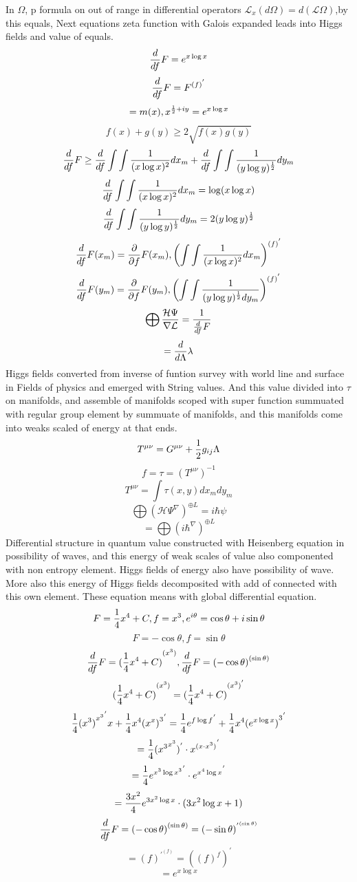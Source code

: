 \documentclass{jsarticle}
\begin{document}
       In $ \Omega $, p formula on out of range in differential operators
  $ \mathcal{L}_x (d \Omega) = d(\mathcal{L} \Omega) $,by this equals, 
  Next equations zeta function with Galois expanded
  leads into Higgs fields and value of equals.
  $$ {d \over df}F = e^{x \log x} $$
  $$ {d \over df}F = F^{{(f)}^{'}} $$
  $$ = m(x), x^{{1 \over 2} + iy} = e^{x \log x} $$
  $$ f(x) + g(y) \ge 2 \sqrt{f(x) g(y)} $$ 
  $$ {d \over df}F \ge {d \over df}\int \int{1 \over (x \log x)^2}dx_m 
  + {d \over df}\int \int{1 \over (y \log y)^{1 \over 2}}dy_m $$
  $$ {d \over df}  \int \int{1 \over (x \log x)^2}dx_m = \log (x \log x) $$
  $$ {d \over df}\int \int{1 \over (y \log y)^{1 \over 2}}dy_m = 
  2(y \log y)^{1 \over 2} $$
  $$  {d \over df} F(x_m) = {\partial \over \partial f}F(x_m),
  \left({\int \int{1 \over (x \log x)^2}dx_m}\right)^{(f)^{'}} $$ 
  $$ {d \over df} F(y_m) = {\partial \over \partial f}F(y_m),
  \left({\int \int{1 \over (y \log y)^{1 \over 2}dy_m}}\right)^{(f)^{'}} $$
  $$ \bigoplus {\mathcal{H}\Psi \over \nabla \mathcal{L}} 
     = {1 \over {{d \over d f}F}}  $$
  $$ = {d \over d \Lambda}\lambda $$
  Higgs fields converted from inverse of funtion survey with world line and
  surface in Fields of physics and emerged with String values.
  And this value divided into $\tau$ on manifolds, and assemble
  of manifolds scoped with super function summuated with regular group element
  by summuate of manifolds, and this manifolds come into weaks scaled of 
  energy at that ends.
  $$ T^{\mu\nu} =  {G^{\mu\nu} + {1 \over 2}g_{ij}\Lambda} $$
  $$ f = \tau = \left(T^{\mu\nu}\right)^{-1} $$
  $$ T^{\mu\nu} = \int \tau(x,y) dx_m dy_m $$
  $$ \bigoplus \left({\mathcal{H}\Psi}^{\nabla} \right)^{\oplus L} = 
  i \hbar \psi $$
  $$ = \bigoplus {{\left({i \hbar}^{\nabla} \right)}^{\oplus L}} $$
  Differential structure in quantum value constructed with Heisenberg equation
  in possibility of waves, and this energy of weak scales of value 
  also componented with non entropy element. Higgs fields of energy also
  have possibility of wave.
  More also this energy of Higgs fields decomposited with add of connected
  with this own element.
  These equation means with global differential equation.
  $$ F = {1 \over 4}x^4 + C, f = x^3, e^{i \theta} = \cos \theta +
  i \sin \theta $$
  $$ F = - \cos \theta, f = \sin \theta $$
  $$ {d \over df}F = {({1 \over 4}x^4 + C)}^{(x^3)}, 
  {d \over df}F = {(-\cos \theta)}^{(\sin \theta)} $$
  $$ {({1 \over 4}x^4 + C)}^{(x^3)} = {({1 \over 4}x^4 + C)}^{(x^3)^{'}} $$
  $$ {1 \over 4}{{(x^3)}^{x^3}}^{'} x + {1 \over 4}x^4 {({x^x)}^3}^{'} 
  = {1 \over 4}{e^{f \log f}}^{'} + {1 \over 4}{x^4 {(e^{x \log x})}^3}^{'} $$
  $$  = {1 \over 4}({{x^3}^{x^3}})^{'} \cdot {x^{(x \cdot x^3)}}^{'}  $$
  $$ = {1 \over 4}{e^{x^3 \log x^3}}^{'} \cdot {e^{x^4 \log x}}^{'} $$
  $$ = {3x^2 \over 4}e^{3x^2 \log x}\cdot (3x^2 \log x + 1) $$
  $$ {d \over df}F = {(-\cos \theta)}^{(\sin \theta)} = 	
   (- \sin \theta)^{{'}^{(\sin \theta)}} $$
  $$ = (f)^{{'}^{(f)}} = {((f)^f)}^{'} $$
  $$ = e^{x \log x} $$
\end{document}
